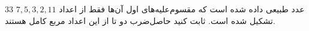 \EXERCISE
$33$
عدد طبیعی داده شده است که مقسوم‌علیه‌های اول آن‌ها فقط از اعداد
$7, 5, 3, 2, 11$
تشکیل شده است. ثابت کنید حاصل‌ضرب دو تا از این اعداد مربع کامل هستند.
